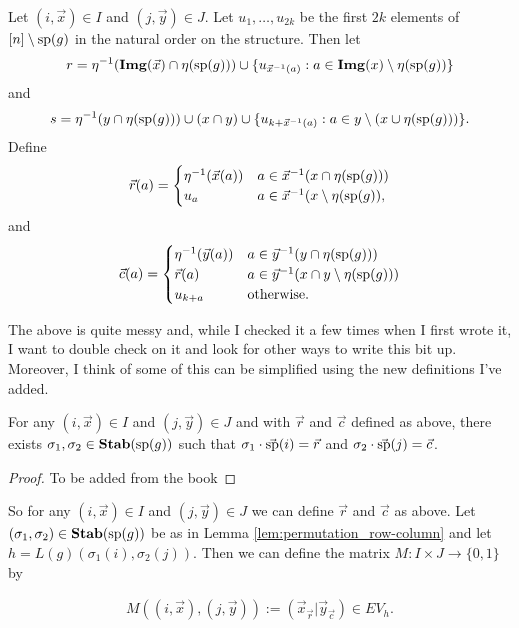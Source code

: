 \documentclass[../paper.tex]{subfiles}
\begin{document}
Let $(i, \vec{x}) \in I$ and $(j, \vec{y}) \in J$. Let $u_1 , \ldots , u_{2k}$
be the first $2k$ elements of $[n] \setminus \text{sp}(g)$ in the natural order on
the structure. Then let
\[r = \eta^{-1} (\text{\textbf{Img}}(\vec{x}) \cap \eta (\text{sp}(g))) \cup
  \{u_{\vec{x}^{-1}(a)}: a \in \text{\textbf{Img}}(x) \setminus \eta (\text{sp} (g))\} \] and
\[s = \eta^{-1} (y \cap \eta (\text{sp}(g))) \cup (x \cap y) \cup \{ u_{k +
    \vec{x}^{-1}(a)} : a \in y \setminus (x \cup \eta (\text{sp} (g))) \}. \]
Define
\[
  \vec{r} (a) =
  \begin{cases}
    \eta^{-1} (\vec{x} (a)) & a \in \vec{x}^{-1} (x \cap \eta (\text{sp}(g))) \\
    u_{a} & a \in \vec{x}^{-1} (x \setminus \eta(\text{sp}(g)),
  \end{cases}
\]
and
\[
  \vec{c} (a) =
  \begin{cases}
    \eta^{-1} (\vec{y} (a)) & a \in \vec{y}^{-1}(y \cap \eta (\text{sp} (g))) \\
    \vec{r} (a) & a \in \vec{y}^{-1} (x \cap y \setminus \eta (\text{sp} (g))) \\
    u_{k+a} & \text{otherwise}.
  \end{cases}
\]

\begin{remark}
  The above is quite messy and, while I checked it a few times when I first
  wrote it, I want to double check on it and look for other ways to write this
  bit up. Moreover, I think of some of this can be simplified using the new
  definitions I've added.
\end{remark}

\begin{lem}
  \label{lem:permutation_row-column}
  For any $(i, \vec{x}) \in I$ and $(j, \vec{y}) \in J$ and with $\vec{r}$ and
  $\vec{c}$ defined as above, there exists $\sigma_1, \sigma_2 \in \text{\textbf{Stab}} (\text{sp} (g))$
  such that $\sigma_1 \cdot \vec{\text{sp}}(i) = \vec{r}$ and $\sigma_2 \cdot
  \vec{\text{sp}}(j) = \vec{c}$.
\end{lem}
\begin{proof}
  To be added from the book
\end{proof}

So for any $(i, \vec{x}) \in I$ and $(j, \vec{y}) \in J$ we can define $\vec{r}$
and $\vec{c}$ as above. Let $(\sigma_1, \sigma_2) \in \text{\textbf{Stab}} (\text{sp} (g))$ be as in Lemma
\ref{lem:permutation_row-column} and let $h = L(g)(\sigma_1(i), \sigma_2 (j))$.
Then we can define the matrix $M : I \times J \rightarrow \{0,1\}$ by

\begin{align*}
  M((i , \vec{x}), (j, \vec{y})) := (\vec{x}_{\vec{r}} \vert \vec{y}_{\vec{c}}) \in EV_h.
\end{align*}
\end{document}

